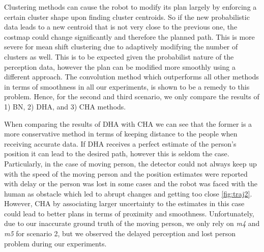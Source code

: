 Clustering methods can cause the robot to modify its plan largely by enforcing a certain cluster shape upon finding cluster centroids. So if the new probabilistic data leads to a new centroid that is not very close to the previous one, the costmap could change significantly and therefore the planned path. This is more severe for mean shift clustering due to adaptively modifying the number of clusters as well. This is to be expected given the probabilist nature of the perception data, however the plan can be modified more smoothly using a different approach. The convolution method which outperforms all other methods in terms of smoothness in all our experiments, is shown to be a remedy to this problem. Hence, for the second and third scenario, we only compare the results of 1) BN, 2) DHA, and 3) CHA methods.  

When comparing the results of DHA with CHA we can see that the former is a more conservative method in terms of keeping distance to the people when receiving accurate data. If DHA receives a perfect estimate of the person's position it can lead to the desired path, however this is seldom the case. Particularly, in the case of moving person, the detector could not always keep up with the speed of the moving person and the position estimates were reported with delay or the person was lost in some cases and the robot was faced with the human as obstacle which led to abrupt changes and getting too close \ref{fig:traj2}. However, CHA by associating larger uncertainty to the estimates in this case could lead to better plans in terms of proximity and smoothness. Unfortunately, due to our inaccurate ground truth of the moving person, we only rely on \textit{m4} and \textit{m5} for scenario 2, but we observed the delayed perception and lost person problem during our experiments. 

